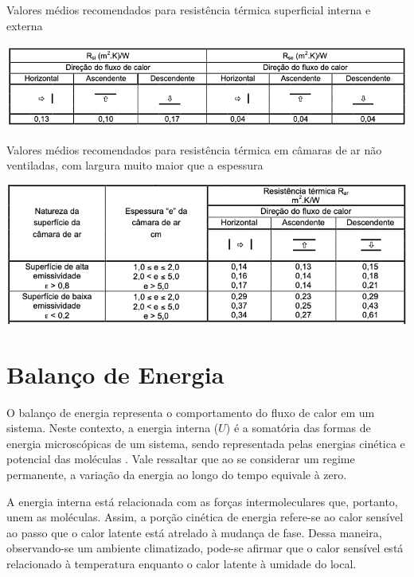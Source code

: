 \documentclass[acronym,symbols,table]{fei}
\begin{document}
\begin{table}[!htb] 
 \centering
    \caption{Valores médios recomendados para resistência térmica superficial interna e externa}
    \includegraphics[width=1.0\linewidth]{Tabelas/Req_Interna_NBR15220.png}
    \label{tab:Req_NBR15220}
\end{table}

\begin{table}[!htb] 
 \centering
    \caption{Valores médios recomendados para resistência térmica em câmaras de ar não ventiladas, com largura muito maior que a espessura}
    \includegraphics[width=1.0\linewidth]{Tabelas/Req_CamaraAr_NBR15220.png}
    \label{tab:Req_Camaras}
\end{table}

\newpage

\section{Balanço de Energia} \label{balenergia}

O balanço de energia representa o comportamento do fluxo de calor em um sistema. Neste contexto, a energia interna ($U$) é a somatória das formas de energia microscópicas de um sistema, sendo representada pelas energias cinética e potencial das moléculas \cite{cengel1998heat}. Vale ressaltar que ao se considerar um regime permanente, a variação da energia ao longo do tempo equivale à zero.

A energia interna está relacionada com as forças intermoleculares que, portanto, unem as moléculas. Assim, a porção cinética de energia refere-se ao calor sensível ao passo que o calor latente está atrelado à mudança de fase. Dessa maneira, observando-se um ambiente climatizado, pode-se afirmar que o calor sensível está relacionado à temperatura enquanto o calor latente à umidade do local.
\end{document}
